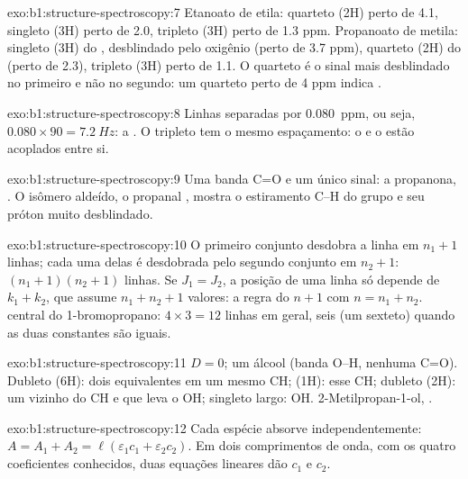 \begin{solution}{exo:b1:structure-spectroscopy:7}
Etanoato de etila: quarteto (2H) perto de 4.1, singleto (3H) perto de
2.0, tripleto (3H) perto de 1.3 ppm. Propanoato de metila: singleto (3H)
do , desblindado pelo oxigênio (perto de 3.7 ppm), quarteto (2H)
do  (perto de 2.3), tripleto (3H) perto de 1.1. O quarteto é o
sinal mais desblindado no primeiro e não no segundo: um quarteto perto de
4 ppm indica .
\end{solution}

\begin{solution}{exo:b1:structure-spectroscopy:8}
Linhas separadas por \qty{0.080}{ppm}, ou seja, $0.080 \times 90 = \qty{7.2}{Hz}$:
a . O tripleto tem o mesmo espaçamento: o
 e o  estão acoplados entre si.
\end{solution}

\begin{solution}{exo:b1:structure-spectroscopy:9}
Uma banda C=O e um único sinal: a propanona, . O isômero
aldeído, o propanal , mostra o estiramento C--H do grupo
 e seu próton muito desblindado.
\end{solution}

\begin{solution}{exo:b1:structure-spectroscopy:10}
O primeiro conjunto desdobra a linha em $n_1 + 1$ linhas; cada uma delas
é desdobrada pelo segundo conjunto em $n_2 + 1$: $(n_1 + 1)(n_2 + 1)$
linhas. Se $J_1 =
J_2$, a posição de uma linha só depende de $k_1 + k_2$, que assume
$n_1 + n_2 +
1$ valores: a regra do $n + 1$ com $n = n_1 + n_2$.  central do
1-bromopropano: $4 \times 3 = 12$ linhas em geral, seis (um sexteto)
quando as duas constantes são iguais.
\end{solution}

\begin{solution}{exo:b1:structure-spectroscopy:11}
$D = 0$; um álcool (banda O--H, nenhuma C=O). Dubleto (6H): dois 
equivalentes em um mesmo CH;  (1H): esse CH; dubleto (2H): um
 vizinho do CH e que leva o OH; singleto largo: OH.
2-Metilpropan-1-ol, .
\end{solution}

\begin{solution}{exo:b1:structure-spectroscopy:12}
Cada espécie absorve independentemente: $A = A_1 + A_2 = \ell(\varepsilon_1c_1
+ \varepsilon_2c_2)$. Em dois comprimentos de onda, com os quatro
coeficientes conhecidos, duas equações lineares dão $c_1$ e $c_2$.
\end{solution}

